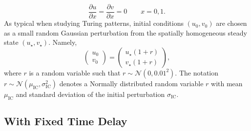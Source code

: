 \begin{equation}\label{neumannbc}
    \frac{\partial u}{\partial x}=\frac{\partial v}{\partial x}=0 \quad \quad x=0,1.
\end{equation}
As typical when studying Turing patterns, initial conditions $(u_0,v_0)$ are chosen as a small random Gaussian perturbation from the spatially homogeneous steady state $(u_\star,v_\star)$. Namely,
\begin{equation}\label{firstic}
\begin{pmatrix}u_0\\v_0\end{pmatrix}=\begin{pmatrix}u_\star(1+r)\\v_\star(1+r)\end{pmatrix},
\end{equation}
where $r$ is a random variable such that $r\sim\mathcal{N}\left(0,0.01^2\right)$. The notation $r\sim\mathcal{N}\left(\mu_{\text{IC}},\sigma_{\text{IC}}^2\right)$ denotes a Normally distributed random variable $r$ with mean $\mu_{\text{IC}}$ and standard deviation of the initial perturbation $\sigma_{\text{IC}}$.

\subsection{With Fixed Time Delay}

